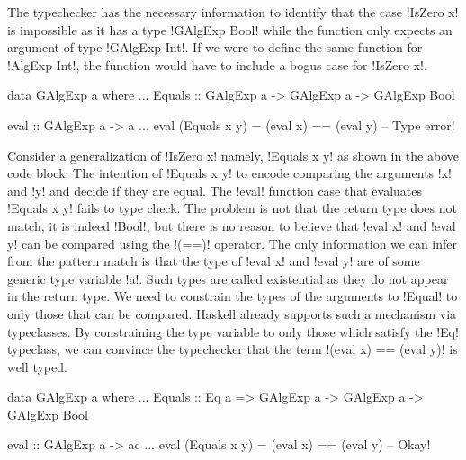 \documentclass[screen,nonacm]{acmart}
\begin{document}
The typechecker has the necessary information to identify that the case
!IsZero x! is impossible as it has a type !GAlgExp Bool! while the
function only expects an argument of type !GAlgExp Int!. If we were to
define the same function for !AlgExp Int!, the function
would have to include a bogus case for !IsZero x!.

\begin{minipage}[ht]{0.6\linewidth}
\begin{CenteredBox}
\begin{code}
data GAlgExp a where
  ...
  Equals :: GAlgExp a -> GAlgExp a -> GAlgExp Bool
\end{code}
\end{CenteredBox}
\end{minipage}%
\begin{minipage}[ht]{0.4\linewidth}
\begin{CenteredBox}
\begin{code}
eval :: GAlgExp a -> a
...
eval (Equals x y) = (eval x) == (eval y)
                           -- Type error!
\end{code}
\end{CenteredBox}
\end{minipage}

Consider a generalization of !IsZero x! namely, !Equals x y! as shown
in the above code block. The intention of !Equals x y! to
encode comparing the arguments !x! and !y! and decide if they are
equal. The !eval! function case that evaluates !Equals x y! fails
to type check. The problem is not that the return type does not match,
it is indeed !Bool!, but there is no reason to believe that
!eval x! and !eval y! can be compared using the !(==)! operator. The
only information we can infer from the pattern match is that
the type of !eval x! and !eval y! are of some generic type variable
!a!. Such types are called existential as they do not appear in
the return type. We need to constrain the types of the
arguments to !Equal! to only those that can be compared.
Haskell already supports such a mechanism via
typeclasses. By constraining the type variable to only those which satisfy
the !Eq! typeclass, we can convince the typechecker that the
term !(eval x) == (eval y)! is well typed.


\begin{minipage}[ht]{0.5\linewidth}
\begin{CenteredBox}
\begin{code}
data GAlgExp a where
...
   Equals :: Eq a => GAlgExp a -> GAlgExp a
                  -> GAlgExp Bool
\end{code}
\end{CenteredBox}
\end{minipage}%
\begin{minipage}[ht]{0.4\linewidth}
\begin{CenteredBox}
\begin{code}
eval :: GAlgExp a -> ac
...
eval (Equals x y) = (eval x) == (eval y)
                              -- Okay!
\end{code}
\end{CenteredBox}
\end{minipage}
\end{document}
